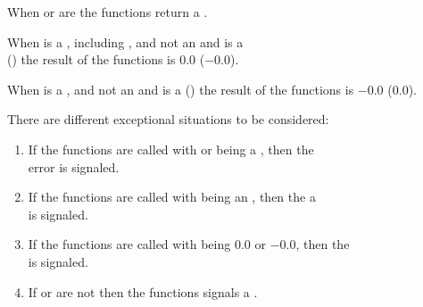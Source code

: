 \documentclass[../Type-Manipulation-Coercion.tex]{subfiles}
\begin{document}
\noindent
When  or  are
 the functions return a .

\noindent
When  is a , including ,
and not an  and  is a
\\
() the result of the
functions is $0.0$ ($-0.0$).

\noindent
When  is a ,
and not an  and  is a
 () the result of the
functions is $-0.0$ ($0.0$).

\DExceptional{}

There are different exceptional situations to be considered:
\begin{enumerate}
\item If the functions are called with
   or  being a
  , then the\\
   error is signaled.
\item If the functions are called with  being an
  , then the a\\
    is signaled.
\item If the functions are called with  being $0.0$ or $-0.0$, then
  the \\
    is signaled.
\item If  or  are not \CL{}
   then the functions signals a .
\end{enumerate}
\end{document}
